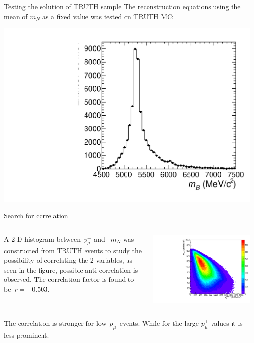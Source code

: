 \documentclass[9pt,usenames,dvipsnames]{beamer}
\begin{document}
 \begin{frame}{Testing the solution of TRUTH sample}
The reconstruction equations using the mean of  $m_N$ as a fixed value was tested on TRUTH MC:
 	\begin{center}
 		\includegraphics[width=.55\textwidth]{assets/Distribution_Bmass_RR_3pimu_FullTRUE}
 	\end{center}
 \end{frame}
\begin{frame}{ Search for correlation}
	\begin{columns}[c]
		
		A 2-D histogram between~$ p_\mu^\bot$ and~ $m_N$ was constructed from TRUTH events to study the possibility of correlating the 2 variables, as seen in the figure, possible anti-correlation is observed. The correlation factor is found to be~$r=-0.503$.
		
		\begin{center}
			\includegraphics[width= \textwidth]{./assets/pmu_perp} 
		\end{center}
	\end{columns}
	The correlation is stronger for low~$ p_\mu^\bot$ events. While for the large $ p_\mu^\bot$ values it is less prominent. 
\end{frame}
\end{document}
